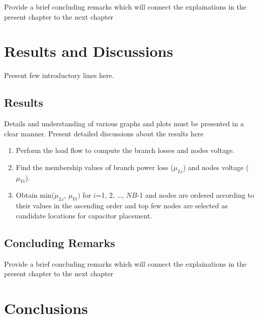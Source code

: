 \documentclass[a4paper,12pt,oneside]{report}%
\begin{document}
Provide a brief concluding remarks which will connect the explainations in the present chapter to the next chapter


\chapter{Results and Discussions}
\label{chapres}

Present few introductory lines here.

\section{Results}
\label{sec:results}

Details and understanding of various graphs and plots must be presented in a clear manner. Present detailed discussions about the results here

\begin{enumerate}
	\item Perform the load flow to compute the branch losses and nodes voltage.
	\item Find the membership values of branch power loss ($\mu _{Li}$) and nodes voltage ($\mu _{Vi}$).
	\item Obtain min($\mu _{Li}$, $\mu _{Vi})$ for $i$=1, 2, \ldots, $NB$-1 and nodes are ordered according to their values in the ascending order and top few nodes
are selected as candidate locations for capacitor placement.
\end{enumerate}

\section {Concluding  Remarks}
Provide a brief concluding remarks which will connect the explainations in the present chapter to the next chapter

\chapter{Conclusions}
\label{chapcon}
\par
\end{document}
